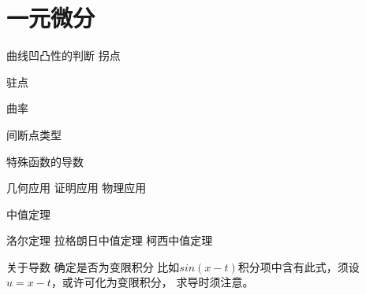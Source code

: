 \chapter{一元微分}

曲线凹凸性的判断
拐点

驻点

曲率

间断点类型

特殊函数的导数

几何应用
证明应用
物理应用

中值定理

洛尔定理
拉格朗日中值定理
柯西中值定理

关于导数
确定是否为变限积分
比如$sin(x-t)$积分项中含有此式，须设$u=x-t$，或许可化为变限积分，
求导时须注意。
